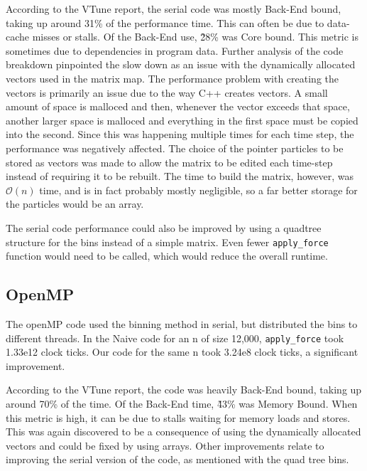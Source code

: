 \documentclass{article}
\begin{document}
According to the VTune report, the serial code was mostly Back-End bound, taking
up around 31\% of the performance time. This can often be due to data-cache
misses or stalls. Of the Back-End use, \~28\% was Core bound. This metric is
sometimes due to dependencies in program data. Further analysis of the code
breakdown pinpointed the slow down as an issue with the dynamically allocated
vectors used in the matrix map. The performance problem with creating the
vectors is primarily an issue due to the way C++ creates vectors. A small amount
of space is malloced and then, whenever the vector exceeds that space, another
larger space is malloced and everything in the first space must be copied into
the second. Since this was happening multiple times for each time step, the
performance was negatively affected. The choice of the pointer particles to be
stored as vectors was made to allow the matrix to be edited each time-step
instead of requiring it to be rebuilt. The time to build the matrix, however,
was $\mathcal{O}(n)$ time, and is in fact probably mostly negligible, so a far
better storage for the particles would be an array.

The serial code performance could also be improved by using a quadtree structure
for the bins instead of a simple matrix. Even fewer \texttt{apply\_force}
function would need to be called, which would reduce the overall runtime.
\subsection{OpenMP}
The openMP code used the binning method in serial, but distributed the bins to
different threads. In the Naive code for an n of size 12,000,
\texttt{apply\_force} took 1.33e12 clock ticks. Our code for the same n took
3.24e8 clock ticks, a significant improvement.

According to the VTune report, the code was heavily Back-End bound, taking up
around 70\% of the time. Of the Back-End time, \~43\% was Memory Bound. When
this metric is high, it can be due to stalls waiting for memory loads and
stores. This was again discovered to be a consequence of using the dynamically
allocated vectors and could be fixed by using arrays. Other improvements relate
to improving the serial version of the code, as mentioned with the quad tree
bins.
\end{document}
